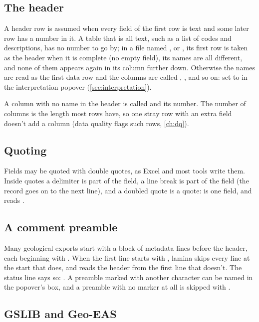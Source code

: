 \subsection{The header}

A header row is assumed when every field of the first row is text and some later row has a number in it.
A table that is all text, such as a list of codes and descriptions, has no number to go by; in a file
named ,  or , its first row is taken as the header when it is complete
(no empty field), its names are all different, and none of them appears again in its column further down.
Otherwise the names are read as the first data row and the columns are called , ,
and so on: set  to  in the interpretation popover (\cref{sec:interpretation}).

A column with no name in the header is called  and its number. The number of columns is the
length most rows have, so one stray row with an extra field doesn't add a column (data quality flags
such rows, \cref{ch:dq}).

\subsection{Quoting}

Fields may be quoted with double quotes, as Excel and most tools write them. Inside quotes a delimiter is
part of the field, a line break is part of the field (the record goes on to the next line), and a doubled
quote is a quote:  is one field, and  reads .

\subsection{A comment preamble}

Many geological exports start with a block of metadata lines before the header, each beginning with
\code{\#}. When the first line starts with \code{\#}, lamina skips every line at the start that does, and
reads the header from the first line that doesn't. The status line says so:
. A preamble marked with another character can be named in the
popover's  box, and a preamble with no marker at all is skipped with .

\subsection{GSLIB and Geo-EAS}\label{sec:geoeas}

